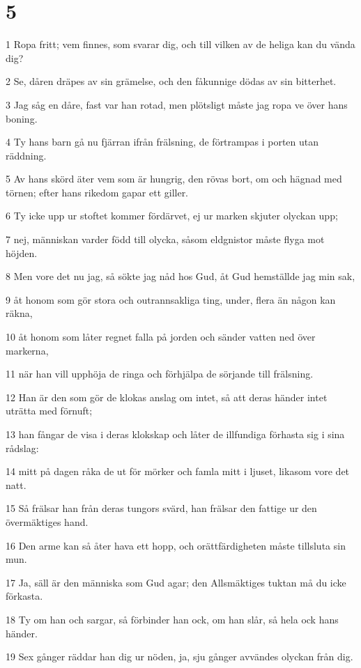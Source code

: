 \chapter{5}

\par 1 Ropa fritt; vem finnes, som svarar dig, och till vilken av de heliga kan du vända dig?
\par 2 Se, dåren dräpes av sin grämelse, och den fåkunnige dödas av sin bitterhet.
\par 3 Jag såg en dåre, fast var han rotad, men plötsligt måste jag ropa ve över hans boning.
\par 4 Ty hans barn gå nu fjärran ifrån frälsning, de förtrampas i porten utan räddning.
\par 5 Av hans skörd äter vem som är hungrig, den rövas bort, om och hägnad med törnen; efter hans rikedom gapar ett giller.
\par 6 Ty icke upp ur stoftet kommer fördärvet, ej ur marken skjuter olyckan upp;
\par 7 nej, människan varder född till olycka, såsom eldgnistor måste flyga mot höjden.
\par 8 Men vore det nu jag, så sökte jag nåd hos Gud, åt Gud hemställde jag min sak,
\par 9 åt honom som gör stora och outrannsakliga ting, under, flera än någon kan räkna,
\par 10 åt honom som låter regnet falla på jorden och sänder vatten ned över markerna,
\par 11 när han vill upphöja de ringa och förhjälpa de sörjande till frälsning.
\par 12 Han är den som gör de klokas anslag om intet, så att deras händer intet uträtta med förnuft;
\par 13 han fångar de visa i deras klokskap och låter de illfundiga förhasta sig i sina rådslag:
\par 14 mitt på dagen råka de ut för mörker och famla mitt i ljuset, likasom vore det natt.
\par 15 Så frälsar han från deras tungors svärd, han frälsar den fattige ur den övermäktiges hand.
\par 16 Den arme kan så åter hava ett hopp, och orättfärdigheten måste tillsluta sin mun.
\par 17 Ja, säll är den människa som Gud agar; den Allsmäktiges tuktan må du icke förkasta.
\par 18 Ty om han och sargar, så förbinder han ock, om han slår, så hela ock hans händer.
\par 19 Sex gånger räddar han dig ur nöden, ja, sju gånger avvändes olyckan från dig.
